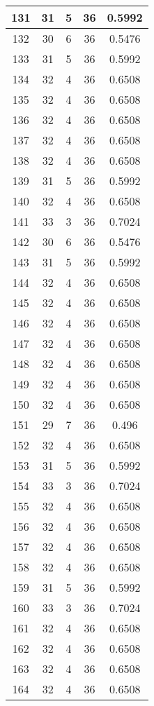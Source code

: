 \documentclass[letterpaper, 12pt]{article}
\begin{document}
\begin{longtable}{|c|c|c|c|c|}
\hline
131 & 31 & 5 & 36 & 0.5992 \\
\hline
132 & 30 & 6 & 36 & 0.5476 \\
\hline
133 & 31 & 5 & 36 & 0.5992 \\
\hline
134 & 32 & 4 & 36 & 0.6508 \\
\hline
135 & 32 & 4 & 36 & 0.6508 \\
\hline
136 & 32 & 4 & 36 & 0.6508 \\
\hline
137 & 32 & 4 & 36 & 0.6508 \\
\hline
138 & 32 & 4 & 36 & 0.6508 \\
\hline
139 & 31 & 5 & 36 & 0.5992 \\
\hline
140 & 32 & 4 & 36 & 0.6508 \\
\hline
141 & 33 & 3 & 36 & 0.7024 \\
\hline
142 & 30 & 6 & 36 & 0.5476 \\
\hline
143 & 31 & 5 & 36 & 0.5992 \\
\hline
144 & 32 & 4 & 36 & 0.6508 \\
\hline
145 & 32 & 4 & 36 & 0.6508 \\
\hline
146 & 32 & 4 & 36 & 0.6508 \\
\hline
147 & 32 & 4 & 36 & 0.6508 \\
\hline
148 & 32 & 4 & 36 & 0.6508 \\
\hline
149 & 32 & 4 & 36 & 0.6508 \\
\hline
150 & 32 & 4 & 36 & 0.6508 \\
\hline
151 & 29 & 7 & 36 & 0.496 \\
\hline
152 & 32 & 4 & 36 & 0.6508 \\
\hline
153 & 31 & 5 & 36 & 0.5992 \\
\hline
154 & 33 & 3 & 36 & 0.7024 \\
\hline
155 & 32 & 4 & 36 & 0.6508 \\
\hline
156 & 32 & 4 & 36 & 0.6508 \\
\hline
157 & 32 & 4 & 36 & 0.6508 \\
\hline
158 & 32 & 4 & 36 & 0.6508 \\
\hline
159 & 31 & 5 & 36 & 0.5992 \\
\hline
160 & 33 & 3 & 36 & 0.7024 \\
\hline
161 & 32 & 4 & 36 & 0.6508 \\
\hline
162 & 32 & 4 & 36 & 0.6508 \\
\hline
163 & 32 & 4 & 36 & 0.6508 \\
\hline
164 & 32 & 4 & 36 & 0.6508 \\

\end{longtable}
\end{document}
